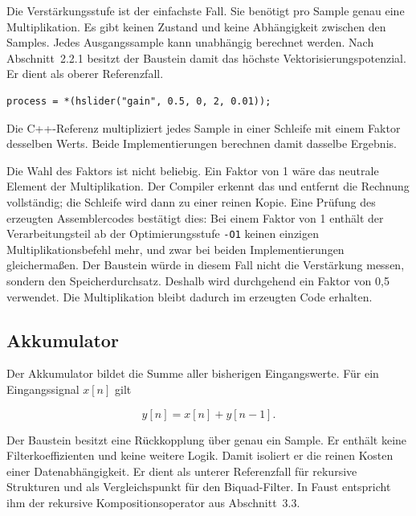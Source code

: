 Die Verstärkungsstufe ist der einfachste Fall. Sie benötigt pro Sample genau
eine Multiplikation. Es gibt keinen Zustand und keine Abhängigkeit zwischen
den Samples. Jedes Ausgangssample kann unabhängig berechnet werden. Nach
Abschnitt~2.2.1 besitzt der Baustein damit das höchste
Vektorisierungspotenzial. Er dient als oberer Referenzfall.

\begin{program}
\caption{Faust-Beschreibung der Verstärkungsstufe}
\label{prog:gain}
\begin{lstlisting}
process = *(hslider("gain", 0.5, 0, 2, 0.01));
\end{lstlisting}
\end{program}

Die C++-Referenz multipliziert jedes Sample in einer Schleife mit einem
Faktor desselben Werts. Beide Implementierungen berechnen damit dasselbe
Ergebnis.

Die Wahl des Faktors ist nicht beliebig. Ein Faktor von 1 wäre das neutrale
Element der Multiplikation. Der Compiler erkennt das und entfernt die
Rechnung vollständig; die Schleife wird dann zu einer reinen Kopie. Eine
Prüfung des erzeugten Assemblercodes bestätigt dies: Bei einem Faktor von 1
enthält der Verarbeitungsteil ab der Optimierungsstufe \texttt{-O1} keinen
einzigen Multiplikationsbefehl mehr, und zwar bei beiden Implementierungen
gleichermaßen. Der Baustein würde in diesem Fall nicht die Verstärkung
messen, sondern den Speicherdurchsatz. Deshalb wird durchgehend ein Faktor
von 0{,}5 verwendet. Die Multiplikation bleibt dadurch im erzeugten Code
erhalten.


\subsection{Akkumulator}

Der Akkumulator bildet die Summe aller bisherigen Eingangswerte. Für ein
Eingangssignal $x[n]$ gilt

\begin{equation}
y[n] = x[n] + y[n-1].
\end{equation}

Der Baustein besitzt eine Rückkopplung über genau ein Sample. Er enthält
keine Filterkoeffizienten und keine weitere Logik. Damit isoliert er die
reinen Kosten einer Datenabhängigkeit. Er dient als unterer Referenzfall für
rekursive Strukturen und als Vergleichspunkt für den Biquad-Filter. In Faust
entspricht ihm der rekursive Kompositionsoperator aus Abschnitt~3.3.

